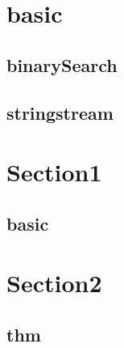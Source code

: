 \section{basic}
    \subsection{binarySearch}
        
    \subsection{stringstream}
        

\section{Section1}
    \subsection{basic}
        

\section{Section2}
    \subsection{thm}
        